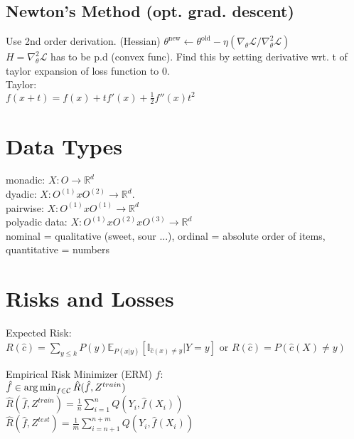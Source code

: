 \subsection*{Newton's Method (opt. grad. descent)}
Use 2nd order derivation. (Hessian)
$\theta^{\mathrm{new}}\leftarrow\theta^{\mathrm{old}}-\eta(\nabla_{\theta}\mathcal{L}/\nabla^2_{\theta}\mathcal{L})$\\
$H=\nabla^2_{\theta}\mathcal{L}$ has to be p.d (convex func).
Find this by setting derivative wrt. t of taylor expansion of loss function to 0. \\
Taylor:\\
$f(x+t)=f(x)+t f'(x)+\frac{1}{2}f''(x)t^2$

\section*{Data Types}
monadic: $X: O \rightarrow \mathbb{R}^d$ \\
dyadic: $X: O^{(1)} x O^{(2)} \rightarrow \mathbb{R}^d $.\\
pairwise: $X: O^{(1)} x O^{(1)} \rightarrow \mathbb{R}^d$ \\
polyadic data: $X: O^{(1)} x O^{(2)} x O^{(3)} \rightarrow \mathbb{R}^d $ \\
nominal = qualitative (sweet, sour ...), ordinal = absolute order of items, quantitative = numbers
\section*{Risks and Losses}
Expected Risk:\\ $R(\hat c) = \sum_{y \leq  k}P(y)\mathbb{E}_{P(x|y)}[\mathbb{I}_{{\hat c(x) \neq y}}| Y = y]$ or 
$R(\hat c) = P(\hat c (X) \neq y)$

Empirical Risk Minimizer (ERM) $\hat{f}$:\\
$\hat{f} \in \operatorname*{arg\,min}_{f \in \mathcal{C}} \hat{R}(\hat{f}, Z^{train})$\\
$\hat{R}(\hat{f}, Z^{train}) = \frac{1}{n} \sum_{i=1}^n Q(Y_i, \hat{f}(X_i))$\\
$\hat{R}(\hat{f}, Z^{test}) = \frac{1}{m} \sum_{i=n+1}^{n+m} Q(Y_i, \hat{f}(X_i))$